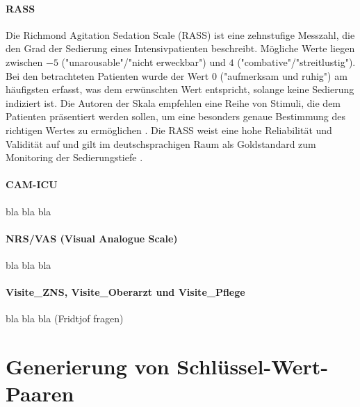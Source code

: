 \paragraph{RASS}
Die Richmond Agitation Sedation Scale (RASS) ist eine zehnstufige Messzahl, die den Grad der Sedierung eines Intensivpatienten beschreibt. Mögliche Werte liegen zwischen $-5$ ("unarousable"/"nicht erweckbar") und $4$ ("combative"/"streitlustig"). Bei den betrachteten Patienten wurde der Wert $0$ ("aufmerksam und ruhig") am häufigsten erfasst, was dem erwünschten Wert entspricht, solange keine Sedierung indiziert ist. Die Autoren der Skala empfehlen eine Reihe von Stimuli, die dem Patienten präsentiert werden sollen, um eine besonders genaue Bestimmung des richtigen Wertes zu ermöglichen \citep{sesslerRichmondAgitationSedation2002a}. Die RASS weist eine hohe Reliabilität und Validität auf und gilt im deutschsprachigen Raum als Goldstandard zum Monitoring der Sedierungstiefe \citep{marxIntensivmedizin2015c, muellerAnalgesieSedierungUnd2015}.

\paragraph{CAM-ICU}
bla bla bla %

\paragraph{NRS/VAS (Visual Analogue Scale)}
bla bla bla

\paragraph{Visite\_ZNS, Visite\_Oberarzt und Visite\_Pflege}
bla bla bla (Fridtjof fragen)



\section{Generierung von Schlüssel-Wert-Paaren}

